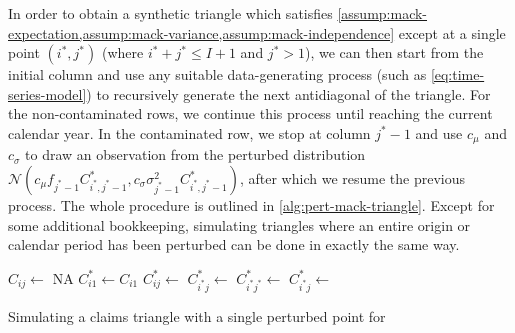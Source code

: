 \documentclass[a4paper]{book}
\begin{document}
In order to obtain a synthetic triangle which satisfies \cref{assump:mack-expectation,assump:mack-variance,assump:mack-independence} except at a single point $(i^*, j^*)$ (where $i^* + j^* \leq I + 1$ and $j^* > 1$), we can then start from the initial column and use any suitable data-generating process (such as \cref{eq:time-series-model}) to recursively generate the next antidiagonal of the triangle. For the non-contaminated rows, we continue this process until reaching the current calendar year. In the contaminated row, we stop at column $j^* - 1$ and use $c_\mu$ and $c_\sigma$ to draw an observation from the perturbed distribution $\mathcal{N}(c_\mu f_{j^* - 1} C^*_{i^*, j^* - 1}, c_\sigma \sigma^2_{j^* - 1} C^*_{i^*, j^* - 1})$, after which we resume the previous process. The whole procedure is outlined in \cref{alg:pert-mack-triangle}. Except for some additional bookkeeping, simulating triangles where an entire origin or calendar period has been perturbed can be done in exactly the same way.

\begin{algorithm}[!htb]
  \begin{algorithmic}
      \State $C_{ij} \gets$ \textsc{NA}
    \EndFor
      \State $C^*_{i1} \gets C_{i1}$
          \State $C^*_{ij} \gets$ 
        \EndFor
      \Else
          \State $C^*_{i^*j} \gets$ 
        \EndFor
        \State $C^*_{i^*j^*} \gets$ 
          \State $C^*_{i^*j} \gets$ 
        \EndFor
      \EndIf
    \EndFor
    \State {}
  \end{algorithmic}
  \caption{Simulating a claims triangle with a single perturbed point for }
  \label{alg:pert-mack-triangle}
\end{algorithm}
\end{document}
